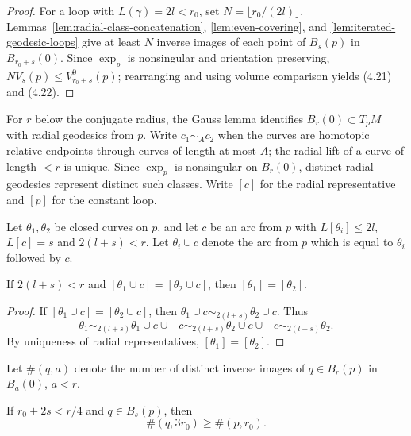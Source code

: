 \begin{proof}
\sketch For a loop with $L(\gamma)=2l<r_0$, set
$N=\lfloor r_0/(2l)\rfloor$. Lemmas~\ref{lem:radial-class-concatenation},
\ref{lem:even-covering}, and \ref{lem:iterated-geodesic-loops} give at least $N$ inverse images
of each point of $B_s(p)$ in $B_{r_0+s}(0)$. Since $\exp_p$ is nonsingular and
orientation preserving, $N V_s(p)\leq V^0_{r_0+s}(p)$; rearranging and using
volume comparison yields (4.21) and (4.22).
\end{proof}

For $r$ below the conjugate radius, the Gauss lemma identifies $B_r(0)\subset
T_pM$ with radial geodesics from $p$. Write $c_1\sim_Ac_2$ when the curves
are homotopic relative endpoints through curves of length at most $A$; the
radial lift of a curve of length $<r$ is unique. Since $\exp_p$ is nonsingular
on $B_r(0)$, distinct radial geodesics represent distinct such classes. Write
$[c]$ for the radial representative and $[p]$ for the constant loop.

Let $\theta_1,\theta_2$ be closed curves on $p$, and let $c$ be an arc from $p$
with $L[\theta_i]\le 2l$, $L[c]=s$ and $2(l+s)<r$. Let $\theta_i \cup c$ denote
the arc from $p$ which is equal to $\theta_i$ followed by $c$.

\begin{lemma}
\label{lem:radial-class-concatenation}

If $2(l+s)<r$ and $[\theta_1\cup c]=[\theta_2\cup c]$, then $[\theta_1]=[\theta_2]$.
\end{lemma}

\begin{proof}
\sketch
If $[\theta_1\cup c]=[\theta_2\cup c]$, then $\theta_1\cup c \sim_{2(l+s)}
\theta_2\cup c$. Thus
\[
\theta_1 \sim_{2(l+s)} \theta_1\cup c\cup -c \sim_{2(l+s)}
\theta_2\cup c\cup -c \sim_{2(l+s)} \theta_2.
\]
By uniqueness of radial representatives, $[\theta_1]=[\theta_2]$.
\end{proof}

Let $\#(q,a)$ denote the number of distinct inverse images of $q \in B_r(p)$ in
$B_a(0)$, $a < r$.

\begin{lemma}
\label{lem:even-covering}

If $r_0 + 2s < r/4$ and $q \in B_s(p)$, then
\[
\#(q,3r_0) \ge \#(p,r_0).
\]
\end{lemma}

